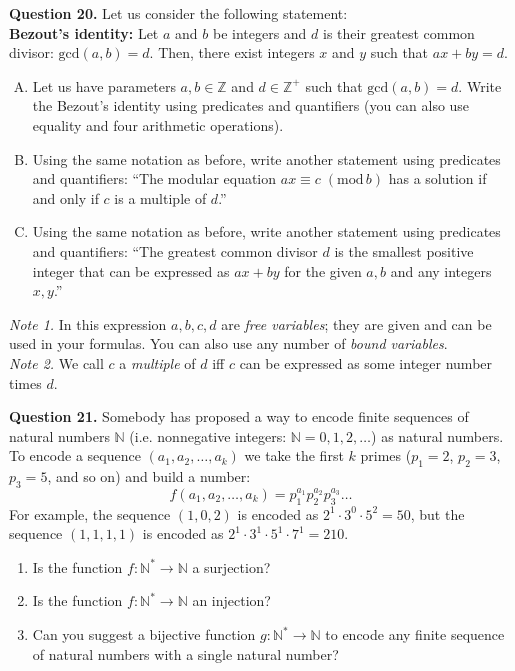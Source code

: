 \documentclass[jou]{apa6}
\begin{document}
{\bf Question 20.} Let us consider the following statement:\\

{\bf Bezout's identity:} 
Let $a$ and $b$ be integers and $d$ is their greatest common divisor: $\text{gcd}(a,b)=d$. 
Then, there exist integers $x$ and $y$ such that $ax + by = d$.\\

\begin{enumerate}[(A)] 
\item Let us have parameters $a,b \in \mathbb{Z}$ and $d \in \mathbb{Z}^{+}$ such that $\text{gcd}(a,b)=d$. 
Write the Bezout's identity using predicates and quantifiers (you can also 
use equality and four arithmetic operations). 
\item Using the same notation as before, write another statement using predicates and quantifiers: 
``The modular equation $ax\equiv{}c\;(\text{mod}\,b)$ has a solution if and only if 
$c$ is a multiple of $d$.''
\item Using the same notation as before, write another statement using predicates and quantifiers: 
``The greatest common divisor $d$ is the smallest positive integer that can be expressed as $ax+by$ for 
the given $a,b$ and any integers $x,y$.''
\end{enumerate}

{\em Note 1.} In this expression $a,b,c,d$ are {\em free variables}; they are given and can be used in your formulas. 
You can also use any number of {\em bound variables}.\\
{\em Note 2.} We call $c$ a {\em multiple} of $d$ iff $c$ can be expressed as some integer number times $d$.

\vspace{6pt}
{\bf Question 21.} Somebody has proposed a way to encode finite sequences of natural numbers $\mathbb{N}$
(i.e. nonnegative integers: $\mathbb{N} = 0,1,2,\ldots$) as natural numbers. 
To encode a sequence $(a_1,a_2,\ldots,a_k)$ we take the first $k$ primes
($p_1 = 2$, $p_2 = 3$, $p_3 = 5$, and so on) and build a number: 
$$f(a_1,a_2,\ldots,a_k) = p_1^{a_1}p_2^{a_2}p_3^{a_3}\ldots$$
For example, the sequence $(1,0,2)$ is encoded as $2^1\cdot{} 3^0 \cdot 5^2 = 50$, 
but the sequence $(1,1,1,1)$ is encoded as $2^1 \cdot 3^1 \cdot 5^1 \cdot 7^1 =  210$.
\begin{enumerate}
\item Is the function $f: \mathbb{N}^{\ast} \rightarrow \mathbb{N}$ a surjection?
\item Is the function $f: \mathbb{N}^{\ast} \rightarrow \mathbb{N}$ an injection?
\item Can you suggest a bijective function $g: \mathbb{N}^{\ast} \rightarrow \mathbb{N}$ to encode any finite sequence of natural numbers 
with a single natural number?
\end{enumerate}
\end{document}
